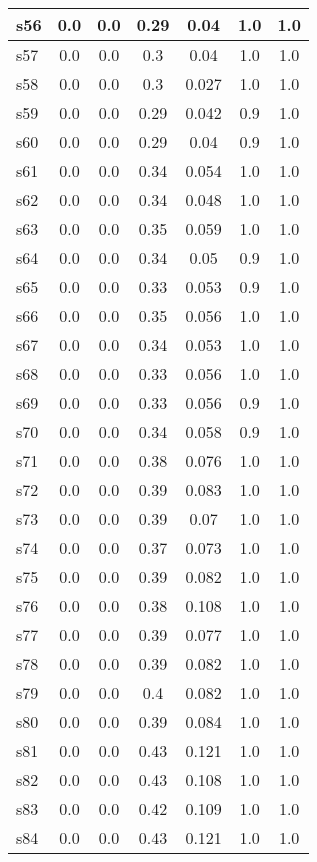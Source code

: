 \documentclass{article}
\begin{document}
\begin{tabular}{|l|c|c|c|c|c|c|}
\hline
s56 &0.0 & 0.0 & 0.29 & 0.04 & 1.0 & 1.0\\
\hline
s57 &0.0 & 0.0 & 0.3 & 0.04 & 1.0 & 1.0\\
\hline
s58 &0.0 & 0.0 & 0.3 & 0.027 & 1.0 & 1.0\\
\hline
s59 &0.0 & 0.0 & 0.29 & 0.042 & 0.9 & 1.0\\
\hline
s60 &0.0 & 0.0 & 0.29 & 0.04 & 0.9 & 1.0\\
\hline
s61 &0.0 & 0.0 & 0.34 & 0.054 & 1.0 & 1.0\\
\hline
s62 &0.0 & 0.0 & 0.34 & 0.048 & 1.0 & 1.0\\
\hline
s63 &0.0 & 0.0 & 0.35 & 0.059 & 1.0 & 1.0\\
\hline
s64 &0.0 & 0.0 & 0.34 & 0.05 & 0.9 & 1.0\\
\hline
s65 &0.0 & 0.0 & 0.33 & 0.053 & 0.9 & 1.0\\
\hline
s66 &0.0 & 0.0 & 0.35 & 0.056 & 1.0 & 1.0\\
\hline
s67 &0.0 & 0.0 & 0.34 & 0.053 & 1.0 & 1.0\\
\hline
s68 &0.0 & 0.0 & 0.33 & 0.056 & 1.0 & 1.0\\
\hline
s69 &0.0 & 0.0 & 0.33 & 0.056 & 0.9 & 1.0\\
\hline
s70 &0.0 & 0.0 & 0.34 & 0.058 & 0.9 & 1.0\\
\hline
s71 &0.0 & 0.0 & 0.38 & 0.076 & 1.0 & 1.0\\
\hline
s72 &0.0 & 0.0 & 0.39 & 0.083 & 1.0 & 1.0\\
\hline
s73 &0.0 & 0.0 & 0.39 & 0.07 & 1.0 & 1.0\\
\hline
s74 &0.0 & 0.0 & 0.37 & 0.073 & 1.0 & 1.0\\
\hline
s75 &0.0 & 0.0 & 0.39 & 0.082 & 1.0 & 1.0\\
\hline
s76 &0.0 & 0.0 & 0.38 & 0.108 & 1.0 & 1.0\\
\hline
s77 &0.0 & 0.0 & 0.39 & 0.077 & 1.0 & 1.0\\
\hline
s78 &0.0 & 0.0 & 0.39 & 0.082 & 1.0 & 1.0\\
\hline
s79 &0.0 & 0.0 & 0.4 & 0.082 & 1.0 & 1.0\\
\hline
s80 &0.0 & 0.0 & 0.39 & 0.084 & 1.0 & 1.0\\
\hline
s81 &0.0 & 0.0 & 0.43 & 0.121 & 1.0 & 1.0\\
\hline
s82 &0.0 & 0.0 & 0.43 & 0.108 & 1.0 & 1.0\\
\hline
s83 &0.0 & 0.0 & 0.42 & 0.109 & 1.0 & 1.0\\
\hline
s84 &0.0 & 0.0 & 0.43 & 0.121 & 1.0 & 1.0\\

\end{tabular}
\end{document}

